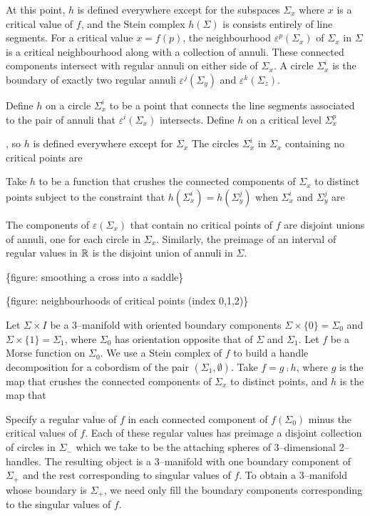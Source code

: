 At this point, $h$ is defined everywhere except for the subspaces $\Sigma_x$ where $x$ is a critical value of $f$, and the Stein complex $h(\Sigma)$ is consists entirely of line segments.
For a critical value $x=f(p)$, the neighbourhood $\varepsilon^p(\Sigma_x)$ of $\Sigma_x$ in $\Sigma$ is a critical neighbourhood along with a collection of annuli.
These connected components intersect with regular annuli on either side of $\Sigma_x$.
A circle $\Sigma_x^i$ is the boundary of exactly two regular annuli $\varepsilon^j(\Sigma_y)$ and $\varepsilon^k(\Sigma_z)$.

Define $h$ on a circle $\Sigma_x^i$ to be a point that connects the line segments associated to the pair of annuli that $\varepsilon^i(\Sigma_x)$ intersects.
Define $h$ on a critical level $\Sigma_x^p$ 

, so $h$ is defined everywhere except for $\Sigma_x$
The circles $\Sigma_x^i$ in $\Sigma_x$ containing no critical points are 


Take $h$ to be a function that crushes the connected components of $\Sigma_x$ to distinct points subject to the constraint that $h(\Sigma_x^i)=h(\Sigma_y^j)$ when $\Sigma_x^i$ and $\Sigma_y^j$ are 



The components of $\varepsilon(\Sigma_x)$ that contain no critical points of $f$ are disjoint unions of annuli, one for each circle in $\Sigma_x$.
Similarly, the preimage of an interval of regular values in $\mathbb{R}$ is the disjoint union of annuli in $\Sigma$.

\{figure: smoothing a cross into a saddle\}

\{figure: neighbourhoods of critical points (index 0,1,2)\}



Let $\Sigma\times I$ be a 3--manifold with oriented boundary components $\Sigma\times\{0\}=\Sigma_0$ and $\Sigma\times\{1\}=\Sigma_1$, where $\Sigma_0$ has orientation opposite that of $\Sigma$ and $\Sigma_1$.
Let $f$ be a Morse function on $\Sigma_0$.
We use a Stein complex of $f$ to build a handle decomposition for a cobordism of the pair $(\Sigma_1,\emptyset)$.
Take $f=g\comp h$, where $g$ is the map that crushes the connected components of $\Sigma_x$ to distinct points, and $h$ is the map that 


 Specify a regular value of $f$ in each connected component of $f(\Sigma_0)$ minus the critical values of $f$.
Each of these regular values has preimage a disjoint collection of circles in $\Sigma_-$ which we take to be the attaching spheres of 3--dimensional 2--handles. 
The resulting object is a 3--manifold with one boundary component of $\Sigma_+$ and the rest corresponding to singular values of $f$.
To obtain a 3--manifold whose boundary is $\Sigma_+$, we need only fill the boundary components corresponding to the singular values of $f$.

